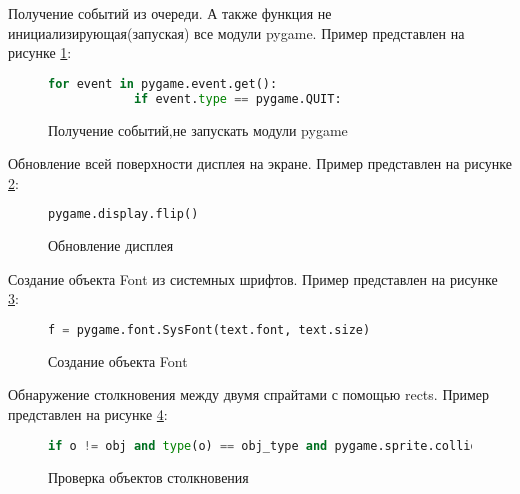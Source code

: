 Получение событий из очереди. А также функция не инициализирующая(запуская) все модули pygame.
Пример представлен на рисунке \ref{getquit:image}:
\begin{figure}[H]
	\begin{lstlisting}[language=Python]
		for event in pygame.event.get():
			if event.type == pygame.QUIT:
	\end{lstlisting}  
	\caption{Получение событий,не запускать модули pygame}
	\label{getquit:image}
\end{figure}
Обновление всей поверхности дисплея на экране.
Пример представлен на рисунке \ref{flip:image}:
\begin{figure}[H]
	\begin{lstlisting}[language=Python]
		pygame.display.flip()
	\end{lstlisting}  
	\caption{Обновление дисплея}
	\label{flip:image}
\end{figure}
Создание объекта Font из системных шрифтов.
Пример представлен на рисунке \ref{sysfont:image}:
\begin{figure}[H]
	\begin{lstlisting}[language=Python]
		f = pygame.font.SysFont(text.font, text.size)
	\end{lstlisting}  
	\caption{Создание объекта Font}
	\label{sysfont:image}
\end{figure}
Обнаружение столкновения между двумя спрайтами с помощью rects.
Пример представлен на рисунке \ref{collide:image}:
\begin{figure}[H]
	\begin{lstlisting}[language=Python]
		if o != obj and type(o) == obj_type and pygame.sprite.collide_rect(o, obj):
	\end{lstlisting}  
	\caption{Проверка объектов столкновения}
	\label{collide:image}
\end{figure}

